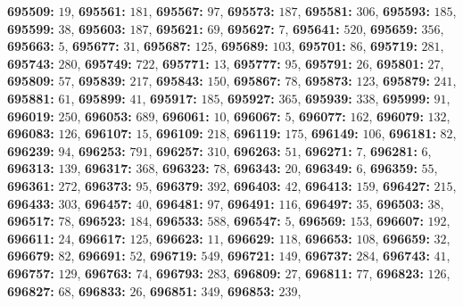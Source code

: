 \textsf{\bfseries 695509:} $19$, \textsf{\bfseries 695561:} $181$, \textsf{\bfseries 695567:} $97$, \textsf{\bfseries 695573:} $187$, \textsf{\bfseries 695581:} $306$, \textsf{\bfseries 695593:} $185$, \textsf{\bfseries 695599:} $38$, \textsf{\bfseries 695603:} $187$, \textsf{\bfseries 695621:} $69$, \textsf{\bfseries 695627:} $7$, \textsf{\bfseries 695641:} $520$, \textsf{\bfseries 695659:} $356$, \textsf{\bfseries 695663:} $5$, \textsf{\bfseries 695677:} $31$, \textsf{\bfseries 695687:} $125$, \textsf{\bfseries 695689:} $103$, \textsf{\bfseries 695701:} $86$, \textsf{\bfseries 695719:} $281$, \textsf{\bfseries 695743:} $280$, \textsf{\bfseries 695749:} $722$, \textsf{\bfseries 695771:} $13$, \textsf{\bfseries 695777:} $95$, \textsf{\bfseries 695791:} $26$, \textsf{\bfseries 695801:} $27$, \textsf{\bfseries 695809:} $57$, \textsf{\bfseries 695839:} $217$, \textsf{\bfseries 695843:} $150$, \textsf{\bfseries 695867:} $78$, \textsf{\bfseries 695873:} $123$, \textsf{\bfseries 695879:} $241$, \textsf{\bfseries 695881:} $61$, \textsf{\bfseries 695899:} $41$, \textsf{\bfseries 695917:} $185$, \textsf{\bfseries 695927:} $365$, \textsf{\bfseries 695939:} $338$, \textsf{\bfseries 695999:} $91$, \textsf{\bfseries 696019:} $250$, \textsf{\bfseries 696053:} $689$, \textsf{\bfseries 696061:} $10$, \textsf{\bfseries 696067:} $5$, \textsf{\bfseries 696077:} $162$, \textsf{\bfseries 696079:} $132$, \textsf{\bfseries 696083:} $126$, \textsf{\bfseries 696107:} $15$, \textsf{\bfseries 696109:} $218$, \textsf{\bfseries 696119:} $175$, \textsf{\bfseries 696149:} $106$, \textsf{\bfseries 696181:} $82$, \textsf{\bfseries 696239:} $94$, \textsf{\bfseries 696253:} $791$, \textsf{\bfseries 696257:} $310$, \textsf{\bfseries 696263:} $51$, \textsf{\bfseries 696271:} $7$, \textsf{\bfseries 696281:} $6$, \textsf{\bfseries 696313:} $139$, \textsf{\bfseries 696317:} $368$, \textsf{\bfseries 696323:} $78$, \textsf{\bfseries 696343:} $20$, \textsf{\bfseries 696349:} $6$, \textsf{\bfseries 696359:} $55$, \textsf{\bfseries 696361:} $272$, \textsf{\bfseries 696373:} $95$, \textsf{\bfseries 696379:} $392$, \textsf{\bfseries 696403:} $42$, \textsf{\bfseries 696413:} $159$, \textsf{\bfseries 696427:} $215$, \textsf{\bfseries 696433:} $303$, \textsf{\bfseries 696457:} $40$, \textsf{\bfseries 696481:} $97$, \textsf{\bfseries 696491:} $116$, \textsf{\bfseries 696497:} $35$, \textsf{\bfseries 696503:} $38$, \textsf{\bfseries 696517:} $78$, \textsf{\bfseries 696523:} $184$, \textsf{\bfseries 696533:} $588$, \textsf{\bfseries 696547:} $5$, \textsf{\bfseries 696569:} $153$, \textsf{\bfseries 696607:} $192$, \textsf{\bfseries 696611:} $24$, \textsf{\bfseries 696617:} $125$, \textsf{\bfseries 696623:} $11$, \textsf{\bfseries 696629:} $118$, \textsf{\bfseries 696653:} $108$, \textsf{\bfseries 696659:} $32$, \textsf{\bfseries 696679:} $82$, \textsf{\bfseries 696691:} $52$, \textsf{\bfseries 696719:} $549$, \textsf{\bfseries 696721:} $149$, \textsf{\bfseries 696737:} $284$, \textsf{\bfseries 696743:} $41$, \textsf{\bfseries 696757:} $129$, \textsf{\bfseries 696763:} $74$, \textsf{\bfseries 696793:} $283$, \textsf{\bfseries 696809:} $27$, \textsf{\bfseries 696811:} $77$, \textsf{\bfseries 696823:} $126$, \textsf{\bfseries 696827:} $68$, \textsf{\bfseries 696833:} $26$, \textsf{\bfseries 696851:} $349$, \textsf{\bfseries 696853:} $239$, 
